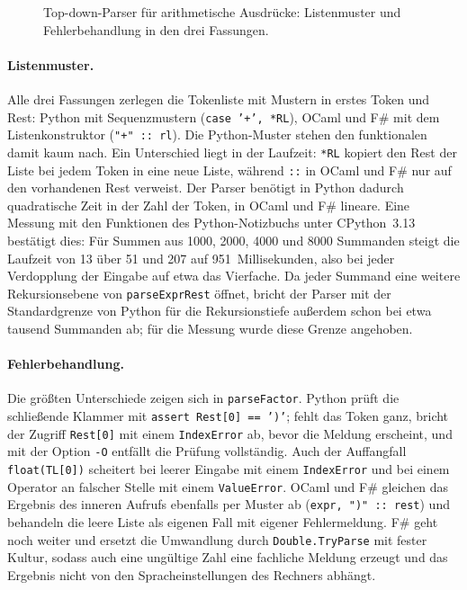 \begin{figure}[tbp]



\caption{Top-down-Parser für arithmetische Ausdrücke: Listenmuster und Fehlerbehandlung in den drei Fassungen.}
\label{fig:topdown_parser}
\end{figure}

\paragraph{Listenmuster.}
Alle drei Fassungen zerlegen die Tokenliste mit Mustern in erstes Token und Rest: Python mit Sequenzmustern (\texttt{case '+', *RL}), OCaml und F\# mit dem Listenkonstruktor (\texttt{"+" :: rl}).
Die Python-Muster stehen den funktionalen damit kaum nach.
Ein Unterschied liegt in der Laufzeit: \texttt{*RL} kopiert den Rest der Liste bei jedem Token in eine neue Liste, während \texttt{::} in OCaml und F\# nur auf den vorhandenen Rest verweist.
Der Parser benötigt in Python dadurch quadratische Zeit in der Zahl der Token, in OCaml und F\# lineare.
Eine Messung mit den Funktionen des Python-Notizbuchs unter CPython~3.13 bestätigt dies: Für Summen aus 1000, 2000, 4000 und 8000 Summanden steigt die Laufzeit von 13 über 51 und 207 auf 951~Millisekunden, also bei jeder Verdopplung der Eingabe auf etwa das Vierfache.
Da jeder Summand eine weitere Rekursionsebene von \texttt{parseExprRest} öffnet, bricht der Parser mit der Standardgrenze von Python für die Rekursionstiefe außerdem schon bei etwa tausend Summanden ab; für die Messung wurde diese Grenze angehoben.

\paragraph{Fehlerbehandlung.}
Die größten Unterschiede zeigen sich in \texttt{parseFactor}.
Python prüft die schließende Klammer mit \texttt{assert Rest[0] == ')'}; fehlt das Token ganz, bricht der Zugriff \texttt{Rest[0]} mit einem \texttt{IndexError} ab, bevor die Meldung erscheint, und mit der Option \texttt{-O} entfällt die Prüfung vollständig.
Auch der Auffangfall \texttt{float(TL[0])} scheitert bei leerer Eingabe mit einem \texttt{IndexError} und bei einem Operator an falscher Stelle mit einem \texttt{ValueError}.
OCaml und F\# gleichen das Ergebnis des inneren Aufrufs ebenfalls per Muster ab (\texttt{expr, ")" :: rest}) und behandeln die leere Liste als eigenen Fall mit eigener Fehlermeldung.
F\# geht noch weiter und ersetzt die Umwandlung durch \texttt{Double.TryParse} mit fester Kultur, sodass auch eine ungültige Zahl eine fachliche Meldung erzeugt und das Ergebnis nicht von den Spracheinstellungen des Rechners abhängt.

